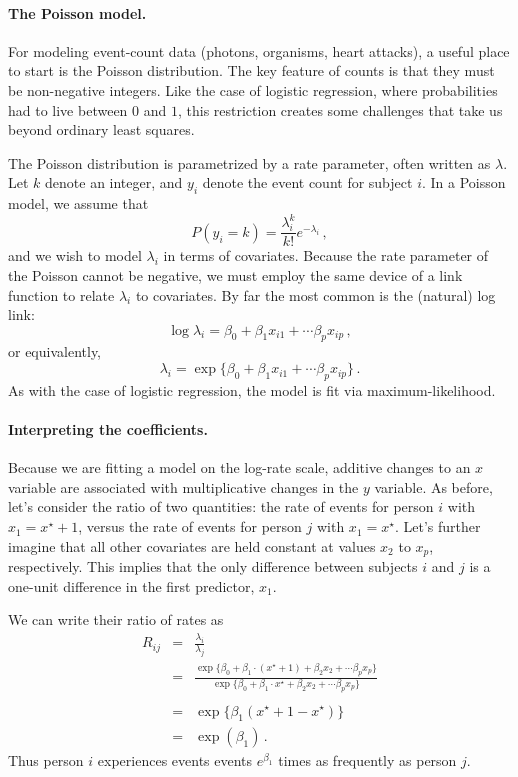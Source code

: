 \documentclass[11pt]{article}
\newcommand{\1}[1]{\mathbf{1}_{\{ {#1} \}}}
\begin{document}
\paragraph{The Poisson model.}

For modeling event-count data (photons, organisms, heart attacks), a useful place to start is the Poisson distribution.  The key feature of counts is that they must be non-negative integers.  Like the case of logistic regression, where probabilities had to live between $0$ and $1$, this restriction creates some challenges that take us beyond ordinary least squares.

The Poisson distribution is parametrized by a rate parameter, often written as $\lambda$.  Let $k$ denote an integer, and $y_i$ denote the event count for subject $i$.  In a Poisson model, we assume that
$$
P(y_i = k) = \frac{\lambda_i^k}{k!} e^{-\lambda_i} \, ,
$$
and we wish to model $\lambda_i$ in terms of covariates.  Because the rate parameter of the Poisson cannot be negative, we must employ the same device of a link function to relate $\lambda_i$ to covariates.  By far the most common is the (natural) log link:
$$
\log \lambda_i = \beta_0 + \beta_1 x_{i1} + \cdots \beta_p x_{ip} \, ,
$$
or equivalently,
$$
 \lambda_i = \exp \{ \beta_0 + \beta_1 x_{i1} + \cdots \beta_p x_{ip} \} \, .
$$
As with the case of logistic regression, the model is fit via maximum-likelihood.

\paragraph{Interpreting the coefficients.}
Because we are fitting a model on the log-rate scale, additive changes to an $x$ variable are associated with multiplicative changes in the $y$ variable.  As before, let's consider the ratio of two quantities: the rate of events for person $i$ with $x_1 = x^{\star} + 1$, versus the rate of events for person $j$ with $x_1 = x^{\star}$.  Let's further imagine that all other covariates are held constant at values $x_2$ to $x_p$, respectively.  This implies that the only difference between subjects $i$ and $j$ is a one-unit difference in the first predictor, $x_1$.

We can write their ratio of rates as
\begin{eqnarray*}
R_{ij} &=& \frac{\lambda_i}{\lambda_j} \\
&=& \frac{ \exp\{ \beta_0 + \beta_1 \cdot (x^{\star} + 1) + \beta_2 x_2 + \cdots \beta_p x_p \} } { \exp\{ \beta_0 + \beta_1 \cdot x^{\star} + \beta_2 x_2 + \cdots \beta_p x_p \} } \\
\\
&=& \exp\{ \beta_1 (x^{\star} + 1 - x^\star) \} \\
&=& \exp (\beta_1) \, .
\end{eqnarray*}
Thus person $i$ experiences events events $e^{\beta_1}$ times as frequently as person $j$.
\end{document}
